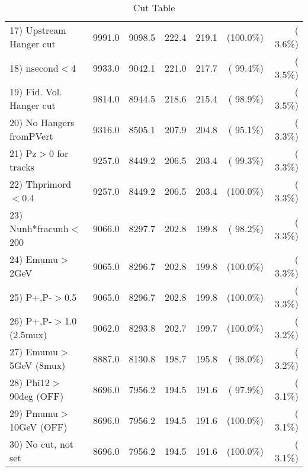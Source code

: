 \begin{table}[h!]
\begin{tabular}{||l||r|r|r|r|r|r||}
 17) Upstream Hanger cut  &       9991.0 &       9098.5 &        222.4 &        219.1 & (100.0\%) & (  3.6\%) \\
 18) nsecond$<$4          &       9933.0 &       9042.1 &        221.0 &        217.7 & ( 99.4\%) & (  3.5\%) \\
 19) Fid. Vol. Hanger cut &       9814.0 &       8944.5 &        218.6 &        215.4 & ( 98.9\%) & (  3.5\%) \\
 20) No Hangers fromPVert &       9316.0 &       8505.1 &        207.9 &        204.8 & ( 95.1\%) & (  3.3\%) \\
 21) Pz$>$0 for tracks    &       9257.0 &       8449.2 &        206.5 &        203.4 & ( 99.3\%) & (  3.3\%) \\
 22) Thprimord$<$0.4      &       9257.0 &       8449.2 &        206.5 &        203.4 & (100.0\%) & (  3.3\%) \\
 23) Nunh*fracunh$<$200   &       9066.0 &       8297.7 &        202.8 &        199.8 & ( 98.2\%) & (  3.3\%) \\
 24) Emumu$>$2GeV         &       9065.0 &       8296.7 &        202.8 &        199.8 & (100.0\%) & (  3.3\%) \\
 25) P+,P-$>$0.5          &       9065.0 &       8296.7 &        202.8 &        199.8 & (100.0\%) & (  3.3\%) \\
 26) P+,P-$>$1.0 (2.5mux) &       9062.0 &       8293.8 &        202.7 &        199.7 & (100.0\%) & (  3.2\%) \\
 27) Emumu$>$5GeV  (8mux) &       8887.0 &       8130.8 &        198.7 &        195.8 & ( 98.0\%) & (  3.2\%) \\
 28) Phi12$>$90deg  (OFF) &       8696.0 &       7956.2 &        194.5 &        191.6 & ( 97.9\%) & (  3.1\%) \\
 29) Pmumu$>$10GeV  (OFF) &       8696.0 &       7956.2 &        194.5 &        191.6 & (100.0\%) & (  3.1\%) \\
 30) No cut, not set      &       8696.0 &       7956.2 &        194.5 &        191.6 & (100.0\%) & (  3.1\%) \\
 \hline
 \hline
 \end{tabular}
 \caption{Cut Table           }
 \label{tab-cutcohjpsi-mumu_cohpip}
 \end{table}
